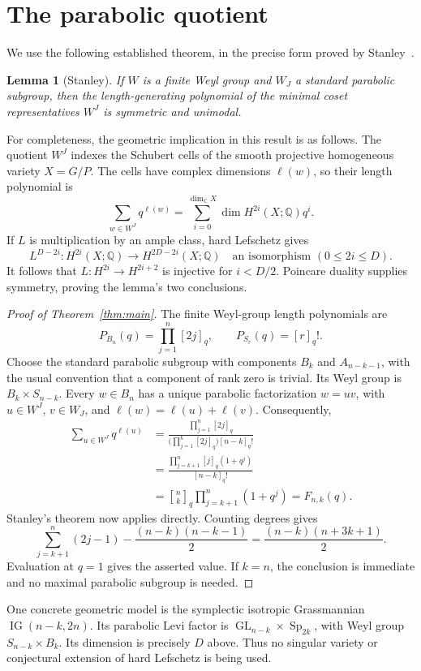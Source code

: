 \documentclass[11pt]{article}
\newtheorem{lemma}[theorem]{Lemma}
\newcommand{\qbin}[2]{\genfrac{[}{]}{0pt}{}{#1}{#2}_q}
\begin{document}
\section{The parabolic quotient}
We use the following established theorem, in the precise form proved by
Stanley~\cite[Theorem~3.1]{Stanley}.
\begin{lemma}[Stanley]
If $W$ is a finite Weyl group and $W_J$ a standard parabolic subgroup,
then the length-generating polynomial of the minimal coset representatives
$W^J$ is symmetric and unimodal.
\end{lemma}
For completeness, the geometric implication in this result is as follows.
The quotient $W^J$ indexes the Schubert cells of the smooth projective
homogeneous variety $X=G/P$. The cells have complex dimensions $\ell(w)$,
so their length polynomial is
\[
\sum_{w\in W^J}q^{\ell(w)}
 =\sum_{i=0}^{\dim_{\mathbb C}X}\dim H^{2i}(X;\mathbb Q)q^i.
\]
If $L$ is multiplication by an ample class, hard Lefschetz gives
\[
L^{D-2i}:H^{2i}(X;\mathbb Q)\longrightarrow
H^{2D-2i}(X;\mathbb Q)
\quad\text{an isomorphism }(0\le2i\le D).
\]
It follows that $L:H^{2i}\to H^{2i+2}$ is injective for $i<D/2$.
Poincare duality supplies symmetry, proving the lemma's two conclusions.

\begin{proof}[Proof of Theorem~\ref{thm:main}]
The finite Weyl-group length polynomials are
\[
P_{B_n}(q)=\prod_{j=1}^n[2j]_q,
\qquad P_{S_r}(q)=[r]_q!.
\]
Choose the standard parabolic subgroup with components $B_k$ and
$A_{n-k-1}$, with the usual convention that a component of rank zero is
trivial. Its Weyl group is $B_k\times S_{n-k}$. Every $w\in B_n$ has a
unique parabolic factorization $w=uv$, with $u\in W^J$, $v\in W_J$, and
$\ell(w)=\ell(u)+\ell(v)$. Consequently,
\begin{align*}
\sum_{u\in W^J}q^{\ell(u)}
 &=\frac{\prod_{j=1}^n[2j]_q}
 {\bigl(\prod_{j=1}^k[2j]_q\bigr)[n-k]_q!}\\
 &=\frac{\prod_{j=k+1}^n[j]_q(1+q^j)}{[n-k]_q!}\\
 &=\qbin nk\prod_{j=k+1}^n(1+q^j)=F_{n,k}(q).
\end{align*}
Stanley's theorem now applies directly. Counting degrees gives
\[
\sum_{j=k+1}^n(2j-1)-\frac{(n-k)(n-k-1)}2
 =\frac{(n-k)(n+3k+1)}2.
\]
Evaluation at $q=1$ gives the asserted value. If $k=n$, the conclusion
is immediate and no maximal parabolic subgroup is needed.
\end{proof}

One concrete geometric model is the symplectic isotropic Grassmannian
$\operatorname{IG}(n-k,2n)$. Its parabolic Levi factor is
$\operatorname{GL}_{n-k}\times\operatorname{Sp}_{2k}$, with Weyl group
$S_{n-k}\times B_k$. Its dimension is precisely $D$ above. Thus no singular
variety or conjectural extension of hard Lefschetz is being used.
\end{document}
